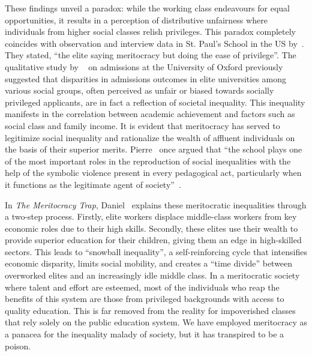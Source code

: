 These findings unveil a paradox: while the working class endeavours for equal opportunities, it results in a perception of distributive unfairness where individuals from higher social classes relish privileges. This paradox completely coincides with observation and interview data in St. Paul's School in the US by~\citet{khan2013saying}. They stated, ``the elite saying meritocracy but doing the ease of privilege''. The qualitative study by ~\citet{nahai2013meritocracy} on admissions at the University of Oxford previously suggested that disparities in admissions outcomes in elite universities among various social groups, often perceived as unfair or biased towards socially privileged applicants, are in fact a reflection of societal inequality. This inequality manifests in the correlation between academic achievement and factors such as social class and family income. It is evident that meritocracy has served to legitimize social inequality and rationalize the wealth of affluent individuals on the basis of their superior merits. Pierre~\citet{bourdieu2017sociologie} once argued that ``the school plays one of the most important roles in the reproduction of social inequalities with the help of the symbolic violence present in every pedagogical act, particularly when it functions as the legitimate agent of society''~\citep{tavsner2022time}.

In \textit{The Meritocracy Trap}, Daniel~\citet{markovits2019meritocracy} explains these meritocratic inequalities through a two-step process. Firstly, elite workers displace middle-class workers from key economic roles due to their high skills. Secondly, these elites use their wealth to provide superior education for their children, giving them an edge in high-skilled sectors. This leads to ``snowball inequality'', a self-reinforcing cycle that intensifies economic disparity, limits social mobility, and creates a ``time divide'' between overworked elites and an increasingly idle middle class. In a meritocratic society where talent and effort are esteemed, most of the individuals who reap the benefits of this system are those from privileged backgrounds with access to quality education. This is far removed from the reality for impoverished classes that rely solely on the public education system. We have employed meritocracy as a panacea for the inequality malady of society, but it has transpired to be a poison.

